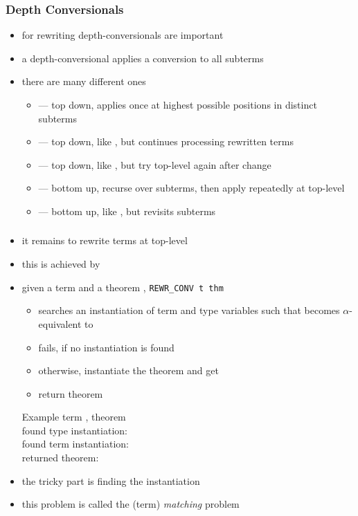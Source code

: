 \begin{frame}
\frametitle{Depth Conversionals}
\begin{itemize}
\item for rewriting depth-conversionals are important
\item a depth-conversional applies a conversion to all subterms
\item there are many different ones
\begin{itemize}
\item {} --- top down, applies  once at highest possible positions in distinct subterms
\item {} --- top down, like , but continues processing rewritten terms
\item {} --- top down, like , but try top-level again after change
\item {} --- bottom up, recurse over subterms, then apply  repeatedly at top-level
\item {} --- bottom up, like , but revisits subterms
\end{itemize}
\end{itemize}
\end{frame}


\begin{frame}
\frametitle{}
\begin{itemize}
\item it remains to rewrite terms at top-level
\item this is achieved by 
\item given a term  and a theorem , \texttt{REWR\_CONV t thm}
\begin{itemize}
\item searches an instantiation of term and type variables such that  becomes $\alpha$-equivalent to 
\item fails, if no instantiation is found
\item otherwise, instantiate the theorem and get 
\item return theorem 
\end{itemize}
\begin{exampleblock}{Example}\scriptsize
term , theorem \\
found type instantiation: \hol{[``:'a`` |-> ``:num``]}\\
found term instantiation: \hol{[``x:num`` |-> ``1``; ``xs`` |-> ``[2;3]``]}\\
returned theorem: 
\end{exampleblock}

\item the tricky part is finding the instantiation
\item this problem is called the (term) \emph{matching} problem
\end{itemize}
\end{frame}


